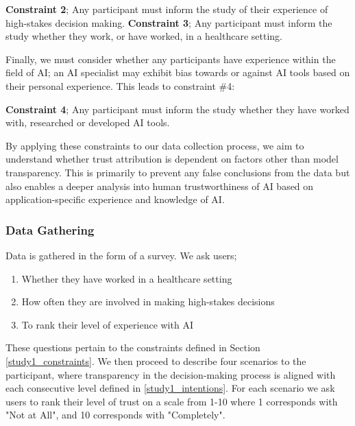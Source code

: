 \documentclass[manuscript,screen,review]{acmart}
\begin{document}
  \begin{center}
    \textbf{Constraint 2}; Any participant must inform the study of their experience of high-stakes decision making.
    \textbf{Constraint 3}; Any participant must inform the study whether they work, or have worked, in a healthcare setting.
\end{center}

Finally, we must consider whether any participants have experience within the field of AI; an AI specialist may exhibit bias towards or against AI tools based on their personal experience. This leads to constraint \#4:
 
  \begin{center}
    \textbf{Constraint 4}; Any participant must inform the study whether they have worked with, researched or developed AI tools.
\end{center}

By applying these constraints to our data collection process, we aim to understand whether trust attribution is dependent on factors other than model transparency. This is primarily to prevent any false conclusions from the data but also enables a deeper analysis into human trustworthiness of AI based on application-specific experience and knowledge of AI.

\subsubsection{Data Gathering}
Data is gathered in the form of a survey. We ask users;

\begin{enumerate}
    \item Whether they have worked in a healthcare setting
    \item How often they are involved in making high-stakes decisions
    \item To rank their level of experience with AI
\end{enumerate}



These questions pertain to the constraints defined in Section \ref{study1_constraints}. We then proceed to describe four scenarios to the participant, where transparency in the decision-making process is aligned with each consecutive level defined in \ref{study1_intentions}. For each scenario we ask users to rank their level of trust on a scale from 1-10 where 1 corresponds with "Not at All", and 10 corresponds with "Completely".
\end{document}
